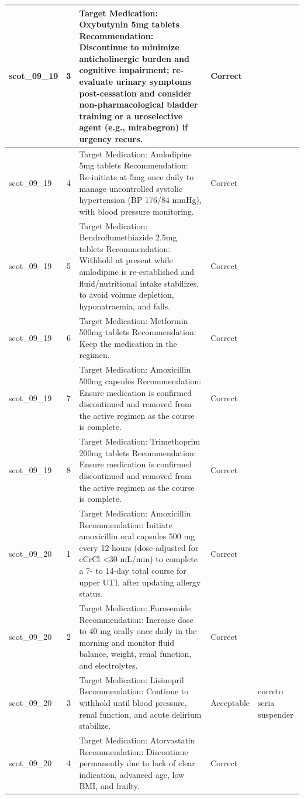 \begin{longtable}{|p{1.45cm}|c|p{10.2cm}|p{1.55cm}|p{2.3cm}|}
\hline
scot\_09\_19 & 3 & Target Medication: Oxybutynin 5mg tablets Recommendation: Discontinue to minimize anticholinergic burden and cognitive impairment; re-evaluate urinary symptoms post-cessation and consider non-pharmacological bladder training or a uroselective agent (e.g., mirabegron) if urgency recurs. & Correct &  \\
\hline
scot\_09\_19 & 4 & Target Medication: Amlodipine 5mg tablets Recommendation: Re-initiate at 5mg once daily to manage uncontrolled systolic hypertension (BP 176/84 mmHg), with blood pressure monitoring. & Correct &  \\
\hline
scot\_09\_19 & 5 & Target Medication: Bendroflumethiazide 2.5mg tablets Recommendation: Withhold at present while amlodipine is re-established and fluid/nutritional intake stabilizes, to avoid volume depletion, hyponatraemia, and falls. & Correct &  \\
\hline
scot\_09\_19 & 6 & Target Medication: Metformin 500mg tablets Recommendation: Keep the medication in the regimen. & Correct &  \\
\hline
scot\_09\_19 & 7 & Target Medication: Amoxicillin 500mg capsules Recommendation: Ensure medication is confirmed discontinued and removed from the active regimen as the course is complete. & Correct &  \\
\hline
scot\_09\_19 & 8 & Target Medication: Trimethoprim 200mg tablets Recommendation: Ensure medication is confirmed discontinued and removed from the active regimen as the course is complete. & Correct &  \\
\hline
scot\_09\_20 & 1 & Target Medication: Amoxicillin Recommendation: Initiate amoxicillin oral capsules 500 mg every 12 hours (dose-adjusted for eCrCl <30 mL/min) to complete a 7- to 14-day total course for upper UTI, after updating allergy status. & Correct &  \\
\hline
scot\_09\_20 & 2 & Target Medication: Furosemide Recommendation: Increase dose to 40 mg orally once daily in the morning and monitor fluid balance, weight, renal function, and electrolytes. & Correct &  \\
\hline
scot\_09\_20 & 3 & Target Medication: Lisinopril Recommendation: Continue to withhold until blood pressure, renal function, and acute delirium stabilize. & Acceptable & correto seria suspender \\
\hline
scot\_09\_20 & 4 & Target Medication: Atorvastatin Recommendation: Discontinue permanently due to lack of clear indication, advanced age, low BMI, and frailty. & Correct &  \\

\end{longtable}
